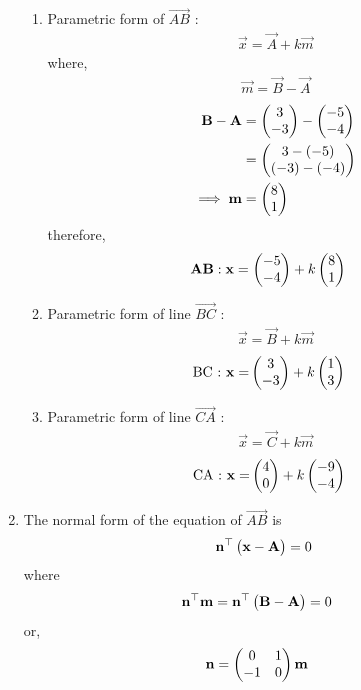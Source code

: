 \documentclass[10pt]{book}
\begin{document}
\begin{enumerate}[label=\thesection.\arabic*.,ref=\thesection.\theenumi]
\begin{enumerate}
\item Parametric form of $\vec{AB}$ :
\begin{align}
\vec{x} = \vec{A} + k\vec{m}
\end{align}
where,
\begin{align}
\vec{m} = \vec{B} - \vec{A}
\end{align}
\begin{align}
\mathbf{B} - \mathbf{A} &= \begin{pmatrix}3\\-3\end{pmatrix} - \begin{pmatrix} -5\\-4\end{pmatrix}\\
&= \begin{pmatrix}3-(-5) \\ (-3)-(-4)\end{pmatrix}\\
\implies \mathbf {m} &= \begin{pmatrix}8\\1\end{pmatrix}
\end{align}
therefore,
\begin{align}
\mathbf{AB} : \mathbf{x} &= \begin{pmatrix}-5\\-4\end{pmatrix} + k\begin{pmatrix}8\\1\end{pmatrix}
\end{align}
\item Parametric form of line $\vec{BC}$ :
\begin{align}
\vec{x} = \vec{B} + k\vec{m}
\end{align}
\begin{align}
\text{BC : } \mathbf{x} =& \begin{pmatrix}3\\-3\end{pmatrix} + k\begin{pmatrix}1\\3\end{pmatrix}
\end{align}
\item Parametric form of line $\vec{CA}$ :
\begin{align}
\vec{x} = \vec{C}+ k\vec{m}
\end{align}
\begin{align}
\text{CA : } \mathbf{x} =& \begin{pmatrix}4\\0\end{pmatrix} + k\begin{pmatrix}-9\\-4\end{pmatrix}
\end{align}
\end{enumerate}
 \item The normal form of the equation of $\vec{AB}$ is
\begin{align}
\mathbf{n}^{\top}\begin{pmatrix}\mathbf{x}-\mathbf{A}\end{pmatrix}=0
\end{align}
where
\begin{align}
\mathbf{n}^{\top}\mathbf{m}&=\mathbf{n}^{\top}\begin{pmatrix}\mathbf{B}-\mathbf{A}\end{pmatrix}=0
\end{align} 
or,\begin{align}
\mathbf{n}&=\begin{pmatrix}0 &1 \\-1 & 0\end{pmatrix}\mathbf{m}
\end{align}

\end{enumerate}
\end{document}
